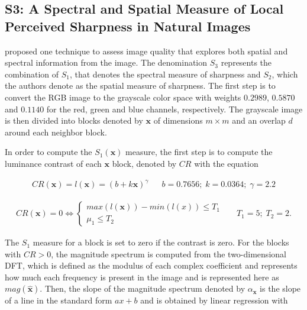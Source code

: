 \subsection{S3: A Spectral and Spatial Measure of Local Perceived Sharpness in Natural Images}

 proposed one technique to assess image quality that explores both spatial and spectral information from the image. The denomination $S_{3}$ represents the combination of $S_{1}$, that denotes the spectral measure of sharpness and $S_{2}$, which the authors denote as the spatial measure of sharpness. The first step is to convert the RGB image to the grayscale color space with weights $0.2989$, $0.5870$ and $0.1140$ for the red, green and blue channels, respectively. The grayscale image is then divided into blocks denoted by $\mathbf{x}$ of dimensions $m \times m$ and an overlap $d$ around each neighbor block.

In order to compute the $S_{1}(\mathbf{x})$ measure, the first step is to compute the luminance contrast of each $\mathbf{x}$ block, denoted by $CR$ with the equation

\begin{align}
\label{eqn:luminance_contrast}
CR(\mathbf{x}) = l(\mathbf{x}) = \left(b + k\mathbf{x}\right)^{\gamma}
&&
b = 0.7656;\; k = 0.0364;\; \gamma = 2.2
\end{align}

\begin{align*}
\label{eqn:contrast_constraints}
CR(\mathbf{x}) = 0 \iff
    \begin{cases}
        max(l(\mathbf{x})) - min(l(x)) \leq T_{1}\\
        \mu_{1} \leq T_{2}    
    \end{cases}
&&
T_{1} = 5;\; T_{2}= 2.
\end{align*}

\vspace{0.1in}

\noindent The $S_{1}$ measure for a block is set to zero if the contrast is zero. For the blocks with $CR > 0$, the magnitude spectrum is computed from the two-dimensional DFT, which is defined as the modulus of each complex coefficient and represents how much each frequency is present in the image and is represented here as $mag(\hat{\mathbf{x}})$. Then, the slope of the magnitude spectrum denoted by $\alpha_{\mathbf{x}}$ is the slope of a line in the standard form $ax + b$ and is obtained by linear regression with

